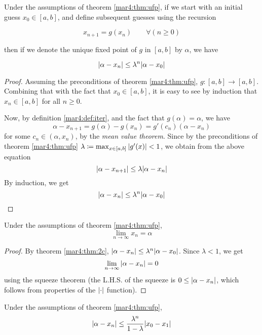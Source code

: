 Under the assumptions of theorem \ref{mar4:thm:ufp}, if we start with an initial guess $x_0 \in [a, b]$, and define subsequent guesses using the recursion
\begin{defn}
	\label{mar4:def:iter}
	\[
		x_{n+1} = g(x_n) \qquad \forall(n \geq 0)
	\]
\end{defn}
then if we denote the unique fixed point of $g$ in $[a, b]$ by $\alpha$, we have
\begin{thm}
	\label{mar4:thm:2c}
	\[
		\abs{\alpha - x_n} \leq \lambda^n\abs{\alpha - x_0}
	\]
\end{thm}

\begin{proof}
	Assuming the preconditions of theorem \ref{mar4:thm:ufp}, $g \colon [a, b] \to [a, b]$. Combining that with the fact that $x_0 \in [a, b]$, it is easy to see by induction that $x_n \in [a, b]$ for all $n \geq 0$.

	Now, by definition \ref{mar4:def:iter}, and the fact that $g(\alpha) = \alpha$, we have
	\[
		\alpha - x_{n+1} = g(\alpha) - g(x_n) = g'(c_n)(\alpha - x_n)
	\]
	for some $c_n \in (\alpha, x_n)$, by the \emph{mean value theorem}. Since by the preconditions of theorem \ref{mar4:thm:ufp} $\lambda \coloneqq \max_{x \in [a, b]} \abs{g'(x)} < 1$, we obtain from the above equation
	\[
		\abs{\alpha - x_{n+1}} \leq \lambda\abs{\alpha - x_n}
	\]
	By induction, we get
	\[
		\abs{\alpha - x_n} \leq \lambda^n\abs{\alpha - x_0}
	\]
	\hfill
\end{proof}
\begin{corr}
	Under the assumptions of theorem \ref{mar4:thm:ufp},
	\[
		\lim_{n\to\infty} x_n = \alpha
	\]
\end{corr}
\begin{proof}
	By theorem \ref{mar4:thm:2c}, $\abs{\alpha - x_n} \leq \lambda^n\abs{\alpha - x_0}$. Since $\lambda < 1$, we get
	\[
		\lim_{n\to\infty}\abs{\alpha - x_n} = 0
	\]
	using the squeeze theorem (the L.H.S. of the squeeze is $0 \leq \abs{\alpha - x_n}$, which follows from properties of the $\abs{\cdot}$ function).
	\hfill
\end{proof}
\begin{corr}
	Under the assumptions of theorem \ref{mar4:thm:ufp},
	\[
		\abs{\alpha - x_n} \leq \frac{\lambda^n}{1 - \lambda}\abs{x_0 - x_1}
	\]
\end{corr}
